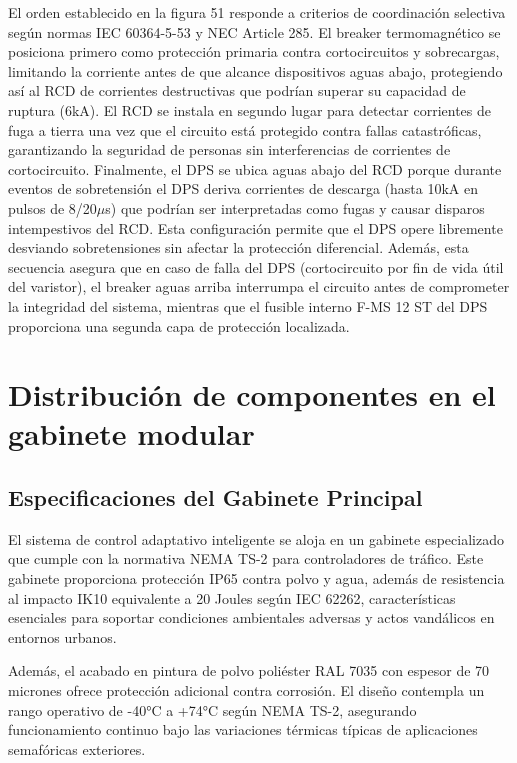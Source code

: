 \documentclass[12pt,a4paper,oneside]{report}
\begin{document}
El orden establecido en la figura 51 responde a criterios de coordinación selectiva según normas IEC 60364-5-53 y NEC Article 285. El breaker termomagnético se posiciona primero como protección primaria contra cortocircuitos y sobrecargas, limitando la corriente antes de que alcance dispositivos aguas abajo, protegiendo así al RCD de corrientes destructivas que podrían superar su capacidad de ruptura (6kA). El RCD se instala en segundo lugar para detectar corrientes de fuga a tierra una vez que el circuito está protegido contra fallas catastróficas, garantizando la seguridad de personas sin interferencias de corrientes de cortocircuito. Finalmente, el DPS se ubica aguas abajo del RCD porque durante eventos de sobretensión el DPS deriva corrientes de descarga (hasta 10kA en pulsos de 8/20\ensuremath{\mu}s) que podrían ser interpretadas como fugas y causar disparos intempestivos del RCD. Esta configuración permite que el DPS opere libremente desviando sobretensiones sin afectar la protección diferencial. Además, esta secuencia asegura que en caso de falla del DPS (cortocircuito por fin de vida útil del varistor), el breaker aguas arriba interrumpa el circuito antes de comprometer la integridad del sistema, mientras que el fusible interno F-MS 12 ST del DPS proporciona una segunda capa de protección localizada.

\section{Distribución de componentes en el gabinete modular}\label{distribuciuxf3n-de-componentes-en-el-gabinete-modular}

\subsection{Especificaciones del Gabinete Principal}\label{especificaciones-del-gabinete-principal}

El sistema de control adaptativo inteligente se aloja en un gabinete especializado que cumple con la normativa NEMA TS-2 para controladores de tráfico. Este gabinete proporciona protección IP65 contra polvo y agua, además de resistencia al impacto IK10 equivalente a 20 Joules según IEC 62262, características esenciales para soportar condiciones ambientales adversas y actos vandálicos en entornos urbanos.

Además, el acabado en pintura de polvo poliéster RAL 7035 con espesor de 70 micrones ofrece protección adicional contra corrosión. El diseño contempla un rango operativo de -40°C a +74°C según NEMA TS-2, asegurando funcionamiento continuo bajo las variaciones térmicas típicas de aplicaciones semafóricas exteriores.
\end{document}
